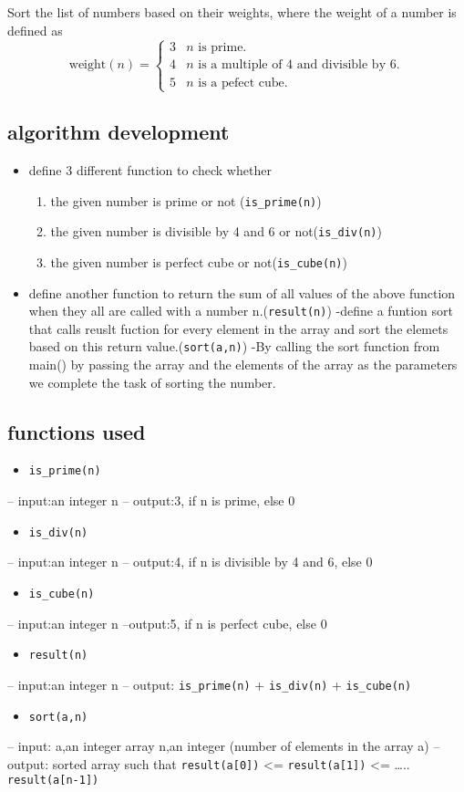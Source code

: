 \documentclass[11pt]{article}
\begin{document}
Sort the list of numbers based on their weights, where
the weight of a number is defined as
\[
   \text{weight}(n) = \begin{cases}
   3 & n \text{ is prime.}\\
   4 & n \text{ is a multiple of 4 and divisible by 6.}\\
   5 & n \text{ is a pefect cube.}
   \end{cases}
   \]
\subsection{algorithm development}
\label{sec-2-1}
\begin{itemize}
\item define 3 different function to check whether
\begin{enumerate}
\item the given number is prime or not (\texttt{is\_prime(n)})
\item the given number is divisible by 4 and 6 or not(\texttt{is\_div(n)})
\item the given number is perfect cube or not(\texttt{is\_cube(n)})
\end{enumerate}
\item define another function to return the sum of all values 
of the above function when they all are called with a
number n.(\texttt{result(n)})
-define a funtion sort that calls reuslt fuction for every 
element in the array and sort the elemets based on this return
value.(\texttt{sort(a,n)})
-By calling the sort function from main() by passing the array 
 and the elements of the array as the parameters we complete the 
 task of sorting the number.
\end{itemize}
\subsection{functions used}
\label{sec-2-2}
\begin{itemize}
\item \texttt{is\_prime(n)}
\end{itemize}
-- input:an integer n
-- output:3, if n is prime, else 0
\begin{itemize}
\item \texttt{is\_div(n)}
\end{itemize}
-- input:an integer n
-- output:4, if n is divisible by 4 and 6, else 0
\begin{itemize}
\item \texttt{is\_cube(n)}
\end{itemize}
-- input:an integer n
--output:5, if n is perfect cube, else 0
\begin{itemize}
\item \texttt{result(n)}
\end{itemize}
-- input:an integer n
-- output: \texttt{is\_prime(n)} +  \texttt{is\_div(n)}  +  \texttt{is\_cube(n)} 
\begin{itemize}
\item \texttt{sort(a,n)}
\end{itemize}
-- input: a,an integer array
        n,an integer (number of elements in the array a) 
-- output: sorted array such that
          \texttt{result(a[0])} <= \texttt{result(a[1])} <= \ldots{}.. \texttt{result(a[n-1])} 
\end{document}
